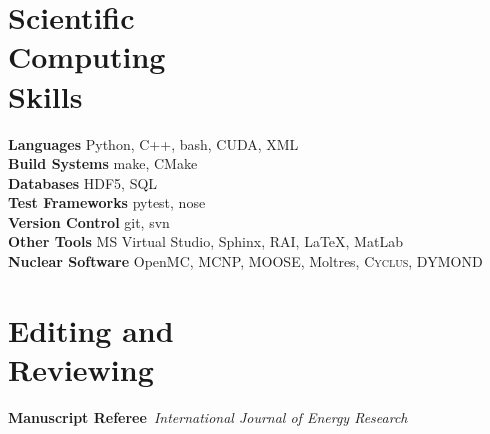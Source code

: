\documentclass[margin,line]{resume}
\begin{document}
\begin{resume}
    \section{\mysidestyle Scientific\\Computing\\Skills}
                \textbf{Languages} \hfill Python, C++, bash, CUDA, XML\vspace{.5mm}\\%
                \textbf{Build Systems} \hfill make, CMake\vspace{.5mm}\\%
                \textbf{Databases} \hfill HDF5, SQL\vspace{.5mm}\\%
                \textbf{Test Frameworks} \hfill pytest, nose\vspace{.5mm}\\%
                \textbf{Version Control} \hfill git, svn\vspace{.5mm}\\%
                \textbf{Other Tools} \hfill MS Virtual Studio, Sphinx, RAI, \LaTeX, MatLab\vspace{.5mm}\\%
                \textbf{Nuclear Software} \hfill OpenMC, MCNP, MOOSE, Moltres, \textsc{Cyclus}, DYMOND
                \vspace{-0.3cm}


    \section{\mysidestyle Editing and\\Reviewing}
    \textbf{Manuscript Referee}~\hfill\emph{International Journal of Energy Research}\\%
                            \vspace{-0.3cm}

\end{resume}
\end{document}
